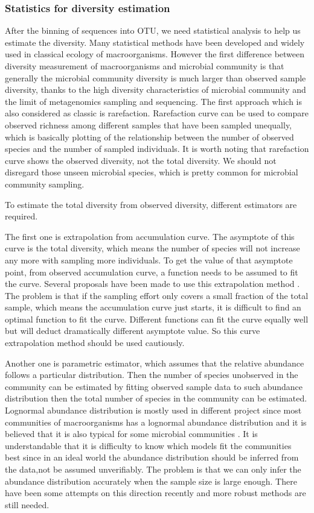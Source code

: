 \subsubsection{Statistics for diversity estimation} After the binning of
sequences into OTU, we need statistical analysis to help us estimate the diversity. Many
statistical methods have been developed and widely used in classical ecology of
macroorganisms. However the first difference between diversity measurement of
macroorganisms and microbial community is that generally the microbial
community diversity is much larger than observed sample diversity, thanks to
the high diversity characteristics of microbial community and the limit of
metagenomics sampling and sequencing. The first approach which is also
considered as classic is rarefaction. Rarefaction curve can be used to compare
observed richness among different samples that have been sampled unequally,
which is basically plotting of the relationship between the number of observed species 
and the number of sampled individuals. It is worth noting that rarefaction curve shows the
observed diversity, not the total diversity. We should not disregard those
unseen microbial species, which is pretty common for microbial community
sampling.

To estimate the total diversity from observed diversity, different estimators
are required.

The first one is extrapolation from accumulation curve. The asymptote of this
curve is the total diversity, which means the number of species will not
increase any more with sampling more individuals. To get the value of that
asymptote point, from observed accumulation curve, a function needs to be
assumed to fit the curve. Several proposals have been made to use this
extrapolation method \cite{colwell2004interpolating, gotelli2001quantifying}.
The problem is that if the sampling effort only covers a small fraction of the
total sample, which means the accumulation curve just starts, it is difficult
to find an optimal function to fit the curve. Different functions can fit the
curve equally well but will deduct dramatically different asymptote value. So
this curve extrapolation method should be used cautiously.

Another one is parametric estimator, which assumes that the relative abundance
follows a particular distribution. Then the number of species unobserved in the
community can be estimated by fitting observed sample data to such abundance
distribution then the total number of species in the community can be
estimated. Lognormal abundance distribution is mostly used in different project
since most communities of macroorganisms has a lognormal abundance distribution
and it is believed that it is also typical for some microbial communities
\cite{Curtis:2002aa, Schloss:2006aa, Quince:2008aa}. It is understandable that
 it is difficulty to know which models fit the communities best since
in an ideal world the abundance distribution should be inferred from the
data,not be assumed unverifiably. The problem is that we can only infer the
abundance distribution accurately when the sample size is large enough. There
have been some attempts on this direction recently \cite{Gans:2005aa} and more
robust methods are still needed.

